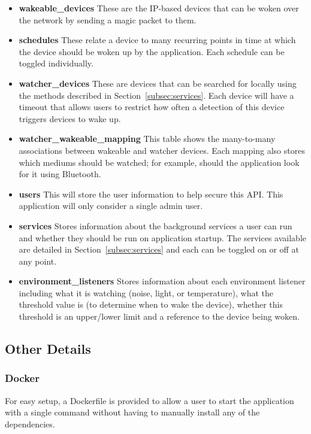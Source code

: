 \begin{itemize}[noitemsep]
    \item \textbf{wakeable\_devices} These are the IP-based devices that can be woken over the network by sending a magic packet to them.
    \item \textbf{schedules} These relate a device to many recurring points in time at which the device should be woken up by the application. Each schedule can be toggled individually.
    \item \textbf{watcher\_devices} These are devices that can be searched for locally using the methods described in Section~\ref{subsec:services}. Each device will have a timeout that allows users to restrict how often a detection of this device triggers devices to wake up.
    \item \textbf{watcher\_wakeable\_mapping} This table shows the many-to-many associations between wakeable and watcher devices. Each mapping also stores which mediums should be watched; for example, should the application look for it using Bluetooth.
    \item \textbf{users} This will store the user information to help secure this API. This application will only consider a single admin user.
    \item \textbf{services} Stores information about the background services a user can run and whether they should be run on application startup. The services available are detailed in Section~\ref{subsec:services} and each can be toggled on or off at any point.
    \item \textbf{environment\_listeners} Stores information about each environment listener including what it is watching (noise, light, or temperature), what the threshold value is (to determine when to wake the device), whether this threshold is an upper/lower limit and a reference to the device being woken. 
\end{itemize}

\subsection{Other Details}

\vspace{2mm}
\subsubsection{Docker}

For easy setup, a Dockerfile is provided to allow a user to start the application with a single command without having to manually install any of the dependencies.

